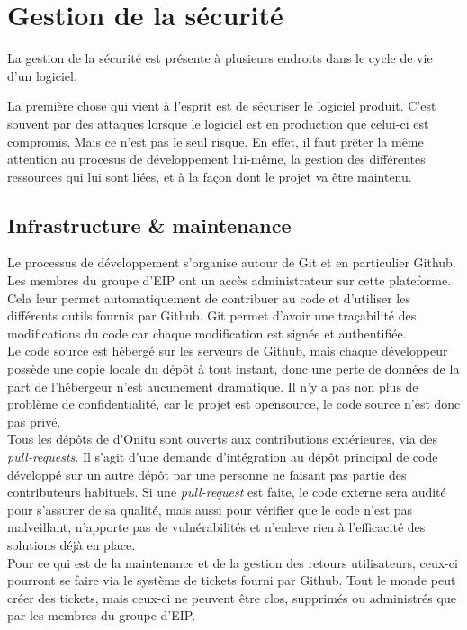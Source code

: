 \section{Gestion de la sécurité}

La gestion de la sécurité est présente à plusieurs endroits dans le cycle de vie d'un logiciel. 

La première chose qui vient à l'esprit est de sécuriser le logiciel produit. C'est souvent par des attaques lorsque le logiciel est en production que celui-ci est compromis. Mais ce n'est pas le seul risque. En effet, il faut prêter la même attention au procesus de développement lui-même, la gestion des différentes ressources qui lui sont liées, et à la façon dont le projet va être maintenu.

\subsection{Infrastructure \& maintenance}

Le processus de développement s'organise autour de Git et en particulier Github. Les membres du groupe d'EIP ont un accès administrateur sur cette plateforme. Cela leur permet automatiquement de contribuer au code et d'utiliser les différents outils fournis par Github. Git permet d'avoir une traçabilité des modifications du code car chaque modification est signée et authentifiée.\\

Le code source est hébergé sur les serveurs de Github, mais chaque développeur possède une copie locale du dépôt à tout instant, donc une perte de données de la part de l'hébergeur n'est aucunement dramatique. Il n'y a pas non plus de problème de confidentialité, car le projet est opensource, le code source n'est donc pas privé.\\

Tous les dépôts de d'Onitu sont ouverts aux contributions extérieures, via des \textit{pull-requests}. Il s'agit d'une demande d'intégration au dépôt principal de code développé sur un autre dépôt par une personne ne faisant pas partie des contributeurs habituels. Si une \textit{pull-request} est faite, le code externe sera audité pour s'assurer de sa qualité, mais aussi pour vérifier que le code n'est pas malveillant, n'apporte pas de vulnérabilités et n'enleve rien à l'efficacité des solutions déjà en place.\\

Pour ce qui est de la maintenance et de la gestion des retours utilisateurs, ceux-ci pourront se faire via le système de tickets fourni par Github. Tout le monde peut créer des tickets, mais ceux-ci ne peuvent être clos, supprimés ou administrés que par les membres du groupe d'EIP.

